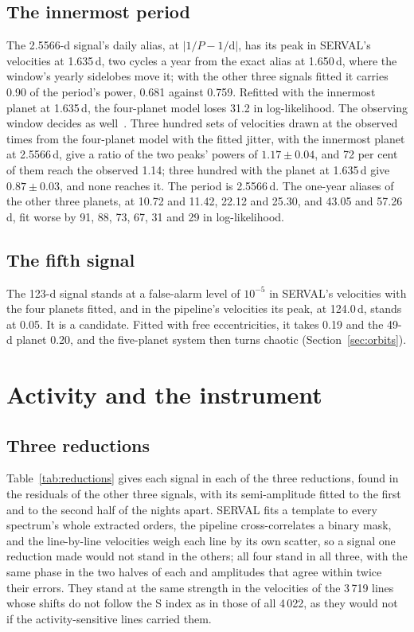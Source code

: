 \documentclass[3p,11pt]{elsarticle}
\begin{document}
\subsection{The innermost period}

The 2.5566-d signal's daily alias, at $|1/P - 1/\mathrm{d}|$, has its peak in SERVAL's velocities at
1.635\,d, two cycles a year from the exact alias at 1.650\,d, where the window's yearly sidelobes move
it; with the other three signals fitted it carries 0.90 of the period's power, 0.681 against 0.759.
Refitted with the innermost planet at 1.635\,d, the four-planet model loses 31.2 in log-likelihood. The
observing window decides as well~\cite{Dawson2010}. Three hundred sets of velocities drawn at the
observed times from the four-planet model with the fitted jitter, with the innermost planet at
2.5566\,d, give a ratio of the two peaks' powers of $1.17 \pm 0.04$, and 72 per cent of them reach the
observed 1.14; three hundred with the planet at 1.635\,d give $0.87 \pm 0.03$, and none reaches it.
The period is 2.5566\,d. The one-year aliases of the other three planets, at 10.72 and 11.42, 22.12 and
25.30, and 43.05 and 57.26\,d, fit worse by 91, 88, 73, 67, 31 and 29 in log-likelihood.

\subsection{The fifth signal}

The 123-d signal stands at a false-alarm level of $10^{-5}$ in SERVAL's velocities with the four
planets fitted, and in the pipeline's velocities its peak, at 124.0\,d, stands at 0.05. It is a
candidate. Fitted with free eccentricities, it takes 0.19 and the 49-d planet 0.20, and the
five-planet system then turns chaotic (Section~\ref{sec:orbits}).

\section{Activity and the instrument}\label{sec:tests}

\subsection{Three reductions}

Table~\ref{tab:reductions} gives each signal in each of the three reductions, found in the residuals of
the other three signals, with its semi-amplitude fitted to the first and to the second half of the nights
apart. SERVAL fits a template to every spectrum's whole extracted orders, the pipeline cross-correlates a
binary mask, and the line-by-line velocities weigh each line by its own scatter, so a signal one
reduction made would not stand in the others; all four stand in all three, with the same phase in the two
halves of each and amplitudes that agree within twice their errors. They stand at the same strength in
the velocities of the 3\,719 lines whose shifts do not follow the S index as in those of all 4\,022, as
they would not if the activity-sensitive lines carried them.
\end{document}
